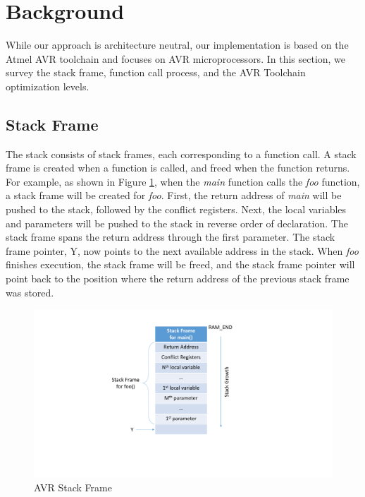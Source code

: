 \section{Background}\label{sec:background}

While our approach is architecture neutral, our implementation is based on the Atmel AVR toolchain and focuses on AVR microprocessors. In this section, we survey the stack frame, function call process, and the AVR Toolchain optimization levels.

\subsection{Stack Frame}

The stack consists of stack frames, each corresponding to a function call. A stack frame is created when a function is called, and freed when the function returns. For example, as shown in Figure \ref{fig:stack_frame}, when the \textit{main} function calls the \textit{foo} function, a stack frame will be created for \textit{foo}. First, the return address of \textit{main} will be pushed to the stack, followed by the conflict registers. Next, the local variables and parameters will be pushed to the stack in reverse order of declaration. The stack frame spans the return address through the first parameter. The stack frame pointer, Y, now points to the next available address in the stack. When \textit{foo} finishes execution, the stack frame will be freed, and the stack frame pointer will point back to the position where the return address of the previous stack frame was stored.

\begin{figure}
\centering
\includegraphics[scale=0.55]{figures/stack_frame_v2.pdf}
\vspace{5pt}
\caption{AVR Stack Frame}
\label{fig:stack_frame}
\end{figure}

